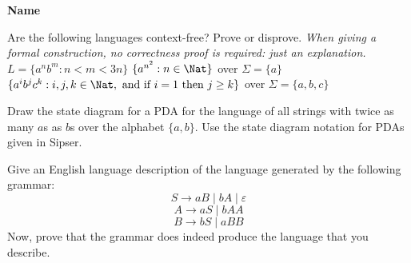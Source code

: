 \documentclass[letterpaper, ps]{cs121}
\begin{document}




\vspace{3mm}
\begin{center} \bf{Name} \end{center}
\vspace{3mm}


Are the following languages context-free? Prove or disprove. \emph{When giving a formal construction, no correctness proof is required: just an explanation.}
\subproblem $L = \{a^n b^m : n < m < 3n \}$
\subproblem $\{a^{n^2} : n \in \Nat\}$ over $\Sigma = \{a\}$
\subproblem $\{a^ib^jc^k : i, j, k \in \Nat, \text{ and if } i = 1 \text{ then } j \ge k\}$ over $\Sigma = \{a,b,c\}$




Draw the state diagram for a PDA for the language of all strings with
twice as many $a$s as $b$s over the alphabet $\{a,b\}$.  Use the
state diagram notation for PDAs given in Sipser.



\subproblem Give an English language description of the language generated by the following grammar:
$$S \rightarrow aB \mid bA \mid \varepsilon$$
$$A \rightarrow aS \mid bAA$$
$$B \rightarrow bS \mid aBB$$
\subproblem Now, prove that the grammar does indeed produce the language that you describe.




\pagebreak %

\end{document}
